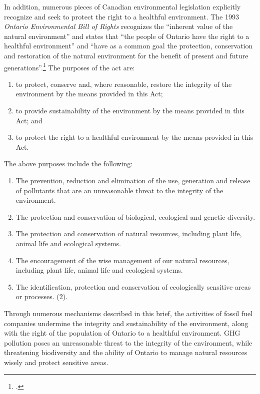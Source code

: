 In addition, numerous pieces of Canadian environmental legislation explicitly recognize and seek to protect the right to a healthful environment.
The 1993 \emph{Ontario Environmental Bill of Rights} recognizes the ``inherent value of the natural environment'' and states that ``the people of Ontario have the right to a healthful environment'' and ``have as a common goal the protection, conservation and restoration of the natural environment for the benefit of present and future generations''.\footcite[][]{OntBillRights}
The purposes of the act are:
\begin{enumerate}
	\item to protect, conserve and, where reasonable, restore the integrity of the environment by the means provided in this Act;
	\item to provide sustainability of the environment by the means provided in this Act; and
	\item to protect the right to a healthful environment by the means provided in this Act.
\end{enumerate}
The above purposes include the following:
\begin{enumerate}
	\item The prevention, reduction and elimination of the use, generation and release of pollutants that are an unreasonable threat to the integrity of the environment.
	\item The protection and conservation of biological, ecological and genetic diversity.
	\item The protection and conservation of natural resources, including plant life, animal life and ecological systems.
	\item The encouragement of the wise management of our natural resources, including plant life, animal life and ecological systems.
	\item The identification, protection and conservation of ecologically sensitive areas or processes. (2). 
\end{enumerate}
Through numerous mechanisms described in this brief, the activities of fossil fuel companies undermine the integrity and sustainability of the environment, along with the right of the population of Ontario to a healthful environment.
GHG pollution poses an unreasonable threat to the integrity of the environment, while threatening biodiversity and the ability of Ontario to manage natural resources wisely and protect sensitive areas.



